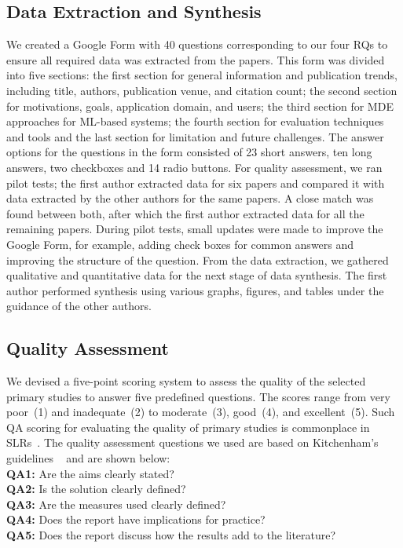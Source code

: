 \subsection{Data Extraction and Synthesis}
We created a Google Form with 40 questions corresponding to our four RQs to ensure all required data was extracted from the papers. This form was divided into five sections: the first section for general information and publication trends, including title, authors, publication venue, and citation count; the second section for motivations, goals, application domain, and users; the third section for MDE approaches for ML-based systems; the fourth section for evaluation techniques and tools and the last section for limitation and future challenges. The answer options for the questions in the form consisted of 23 short answers, ten long answers, two checkboxes and 14 radio buttons. For quality assessment, we ran pilot tests; the first author extracted data for six papers and compared it with data extracted by the other authors for the same papers. A close match was found between both, after which the first author extracted data for all the remaining papers. During pilot tests, small updates were made to improve the Google Form, for example, adding check boxes for common answers and improving the structure of the question. From the data extraction, we gathered qualitative and quantitative data for the next stage of data synthesis. The first author performed synthesis using various graphs, figures, and tables under the guidance of the other authors. 

\subsection{Quality Assessment}
We devised a five-point scoring system to assess the quality of the selected primary studies to answer five predefined questions. The scores range from very poor~(1) and inadequate~(2) to moderate~(3), good~(4), and excellent~(5). Such QA scoring for evaluating the quality of primary studies is commonplace in SLRs~\cite{shamsujjoha2021developing, hidellaarachchi2021effects}. The quality assessment questions we used are based on Kitchenham's guidelines ~\cite{kitchenham2007guidelines} and are shown below: \\
\textbf{QA1:} Are the aims clearly stated? \\
\textbf{QA2:} Is the solution clearly defined?\\
\textbf{QA3:} Are the measures used clearly defined? \\
\textbf{QA4:} Does the report have implications for practice? \\
\textbf{QA5:} Does the report discuss how the results add to the literature? \\

